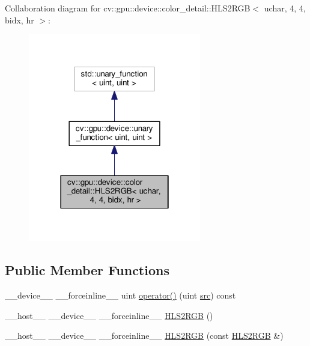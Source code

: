 Collaboration diagram for cv\-:\-:gpu\-:\-:device\-:\-:color\-\_\-detail\-:\-:H\-L\-S2\-R\-G\-B$<$ uchar, 4, 4, bidx, hr $>$\-:\nopagebreak
\begin{figure}[H]
\begin{center}
\leavevmode
\includegraphics[width=214pt]{structcv_1_1gpu_1_1device_1_1color__detail_1_1HLS2RGB_3_01uchar_00_014_00_014_00_01bidx_00_01hr_01_4__coll__graph}
\end{center}
\end{figure}
\subsection*{Public Member Functions}
\begin{DoxyCompactItemize}
\item 
\-\_\-\-\_\-device\-\_\-\-\_\- \-\_\-\-\_\-forceinline\-\_\-\-\_\- uint \hyperlink{structcv_1_1gpu_1_1device_1_1color__detail_1_1HLS2RGB_3_01uchar_00_014_00_014_00_01bidx_00_01hr_01_4_a095706238495b953f43723e71b583b46}{operator()} (uint \hyperlink{legacy_8hpp_a371cd109b74033bc4366f584edd3dacc}{src}) const 
\item 
\-\_\-\-\_\-host\-\_\-\-\_\- \-\_\-\-\_\-device\-\_\-\-\_\- \-\_\-\-\_\-forceinline\-\_\-\-\_\- \hyperlink{structcv_1_1gpu_1_1device_1_1color__detail_1_1HLS2RGB_3_01uchar_00_014_00_014_00_01bidx_00_01hr_01_4_ac0756ffbeadf01e39b5221849bb78031}{H\-L\-S2\-R\-G\-B} ()
\item 
\-\_\-\-\_\-host\-\_\-\-\_\- \-\_\-\-\_\-device\-\_\-\-\_\- \-\_\-\-\_\-forceinline\-\_\-\-\_\- \hyperlink{structcv_1_1gpu_1_1device_1_1color__detail_1_1HLS2RGB_3_01uchar_00_014_00_014_00_01bidx_00_01hr_01_4_a9d39e8b0640f3ee57254abaac3858a29}{H\-L\-S2\-R\-G\-B} (const \hyperlink{structcv_1_1gpu_1_1device_1_1color__detail_1_1HLS2RGB}{H\-L\-S2\-R\-G\-B} \&)
\end{DoxyCompactItemize}


